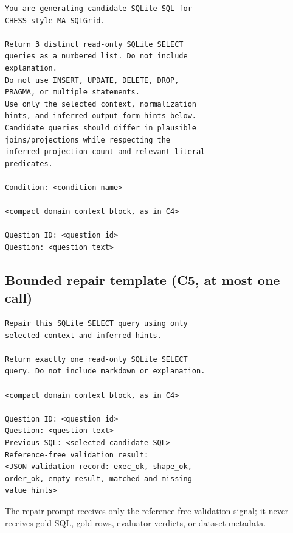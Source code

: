 \documentclass{ieeeaccess}
\begin{document}
\begin{small}
\begin{verbatim}
You are generating candidate SQLite SQL for
CHESS-style MA-SQLGrid.

Return 3 distinct read-only SQLite SELECT
queries as a numbered list. Do not include
explanation.
Do not use INSERT, UPDATE, DELETE, DROP,
PRAGMA, or multiple statements.
Use only the selected context, normalization
hints, and inferred output-form hints below.
Candidate queries should differ in plausible
joins/projections while respecting the
inferred projection count and relevant literal
predicates.

Condition: <condition name>

<compact domain context block, as in C4>

Question ID: <question id>
Question: <question text>
\end{verbatim}
\end{small}

\subsection{Bounded repair template (C5, at most one call)}

\begin{small}
\begin{verbatim}
Repair this SQLite SELECT query using only
selected context and inferred hints.

Return exactly one read-only SQLite SELECT
query. Do not include markdown or explanation.

<compact domain context block, as in C4>

Question ID: <question id>
Question: <question text>
Previous SQL: <selected candidate SQL>
Reference-free validation result:
<JSON validation record: exec_ok, shape_ok,
order_ok, empty result, matched and missing
value hints>
\end{verbatim}
\end{small}

The repair prompt receives only the reference-free validation signal; it never receives gold SQL, gold rows, evaluator verdicts, or dataset metadata.



\EOD
\end{document}
